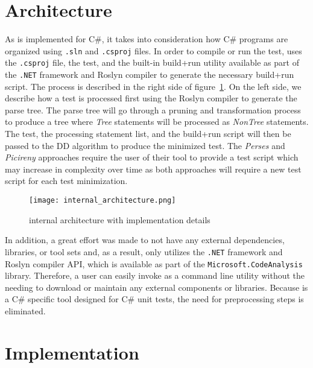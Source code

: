 \section{Architecture}
As \mytool is implemented for C\#, it takes into consideration how C\# programs are organized using \texttt{.sln} and \texttt{.csproj} files. In order to compile or run the test, \mytool uses the \texttt{.csproj} file, the test, and the built-in build+run utility available as part of the \texttt{.NET} framework and Roslyn compiler to generate the necessary build+run script. The process is described in the right side of figure~\ref{fig:internal}. On the left side, we describe how a test is processed first using the Roslyn compiler to generate the parse tree. The parse tree will go through a pruning and transformation process to produce a tree where \emph{Tree} statements will be processed as \emph{NonTree} statements. The test, the processing statement list, and the build+run script will then be passed to the DD algorithm to produce the minimized test. The \emph{Perses} and \emph{Picireny} approaches require the user of their tool to provide a test script which may increase in complexity over time as both approaches will require a new test script for each test minimization. 

\begin{center}
\begin{figure}[!ht]
\texttt{[image: internal\_architecture.png]}
\caption{\mytool internal architecture with implementation details}
\label{fig:internal}
\end{figure}
\end{center}

In addition, a great effort was made to not have any external dependencies, libraries, or tool sets and, as a result, \mytool only utilizes the \texttt{.NET} framework and Roslyn compiler API, which is available as part of the \texttt{Microsoft.CodeAnalysis} library. Therefore, a user can easily invoke \mytool as a command line utility without the needing to download or maintain any external components or libraries. Because \mytool is a C\# specific tool designed for C\# unit tests, the need for preprocessing steps is eliminated.

\section{Implementation}

